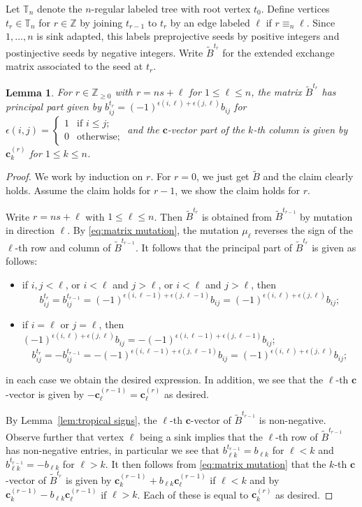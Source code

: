 \documentclass{amsart}
\newtheorem{lemma}[theorem]{Lemma}
\numberwithin{theorem}{section}
\newcommand{\bfc}{\boldsymbol{c}}
\newcommand{\TT}{\mathbb{T}}
\newcommand{\ZZ}{\mathbb{Z}}
\begin{document}
  Let $\TT_n$ denote the $n$-regular labeled tree with root vertex $t_0$.
  Define vertices $t_r\in\TT_n$ for $r\in\ZZ$ by joining $t_{r-1}$ to $t_r$ by an edge labeled $\ell$ if $r\equiv_n\ell$.
  Since $1,\ldots,n$ is sink adapted, this labels preprojective seeds by positive integers and postinjective seeds by negative integers.
  Write $\tilde B^{t_r}$ for the extended exchange matrix associated to the seed at $t_r$.
  \begin{lemma}
    \label{lem:preprojective exchange matrices}
    For $r\in\ZZ_{\ge0}$ with $r=ns+\ell$ for $1\le \ell \le n$, the matrix $\tilde B^{t_r}$ has principal part given by $b^{t_r}_{ij}=(-1)^{\epsilon(i,\ell)+\epsilon(j,\ell)}b_{ij}$ for $\epsilon(i,j)=\begin{cases} 1 & \text{if $i\le j$;}\\ 0 & \text{otherwise;}\end{cases}$ and the $\bfc$-vector part of the $k$-th column is given by $\bfc^{(r)}_k$ for $1\le k\le n$.
  \end{lemma}
  \begin{proof}
    We work by induction on $r$.
    For $r=0$, we just get $\tilde B$ and the claim clearly holds.
    Assume the claim holds for $r-1$, we show the claim holds for $r$.

    Write $r=ns+\ell$ with $1 \le \ell \le n$.
    Then $\tilde B^{t_r}$ is obtained from $\tilde B^{t_{r-1}}$ by mutation in direction $\ell$.
    By \eqref{eq:matrix mutation}, the mutation $\mu_\ell$ reverses the sign of the $\ell$-th row and column of $\tilde B^{t_{r-1}}$.
    It follows that the principal part of $\tilde B^{t_r}$ is given as follows:
    \begin{itemize}
      \item if $i,j<\ell$, or $i<\ell$ and $j>\ell$, or $i<\ell$ and $j>\ell$, then 
        \[b^{t_r}_{ij}=b^{t_{r-1}}_{ij}=(-1)^{\epsilon(i,\ell-1)+\epsilon(j,\ell-1)}b_{ij}=(-1)^{\epsilon(i,\ell)+\epsilon(j,\ell)}b_{ij};\]
      \item if $i=\ell$ or $j=\ell$, then $(-1)^{\epsilon(i,\ell)+\epsilon(j,\ell)}b_{ij}=-(-1)^{\epsilon(i,\ell-1)+\epsilon(j,\ell-1)}b_{ij}$;
        \[b^{t_r}_{ij}=-b^{t_{r-1}}_{ij}=-(-1)^{\epsilon(i,\ell-1)+\epsilon(j,\ell-1)}b_{ij}=(-1)^{\epsilon(i,\ell)+\epsilon(j,\ell)}b_{ij};\]
    \end{itemize}
    in each case we obtain the desired expression.
    In addition, we see that the $\ell$-th $\bfc$-vector is given by $-\bfc^{(r-1)}_\ell=\bfc^{(r)}_\ell$ as desired.

    By Lemma~\ref{lem:tropical signs}, the $\ell$-th $\bfc$-vector of $\tilde B^{t_{r-1}}$ is non-negative.  
    Observe further that vertex $\ell$ being a sink implies that the $\ell$-th row of $\tilde B^{t_{r-1}}$ has non-negative entries, in particular we see that $b^{t_{r-1}}_{\ell k}=b_{\ell k}$ for $\ell<k$ and $b^{t_{r-1}}_{\ell k}=-b_{\ell k}$ for $\ell>k$.
    It then follows from \eqref{eq:matrix mutation} that the $k$-th $\bfc$-vector of $\tilde B^{t_r}$ is given by $\bfc^{(r-1)}_k+b_{\ell k}\bfc^{(r-1)}_\ell$ if $\ell<k$ and by $\bfc^{(r-1)}_k-b_{\ell k}\bfc^{(r-1)}_\ell$ if $\ell>k$.
    Each of these is equal to $\bfc^{(r)}_k$ as desired.
  \end{proof}
\end{document}
